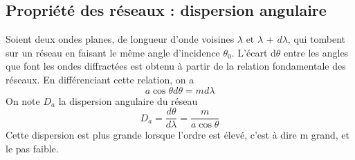 \documentclass[12pt,a4paper]{article}
\begin{document}
\subsection{Propriété des réseaux : dispersion angulaire}
Soient deux ondes planes, de longueur d'onde voisines $\lambda$ et $\lambda$ + $d\lambda$, qui tombent sur un réseau en faisant le même angle d'incidence $\theta_0$. L'écart d$\theta$ entre les angles que font les ondes diffractées est obtenu à partir de la relation fondamentale des réseaux. En différenciant cette relation, on a
$$a\cos\theta d\theta=md\lambda$$
On note $D_a$ la dispersion angulaire du réseau
$$D_a = \dfrac{d\theta}{d\lambda}=\dfrac{m}{a\cos\theta}$$
Cette dispersion est plus grande lorsque l'ordre est élevé, c'est à dire m grand, et le pas faible.
\end{document}
